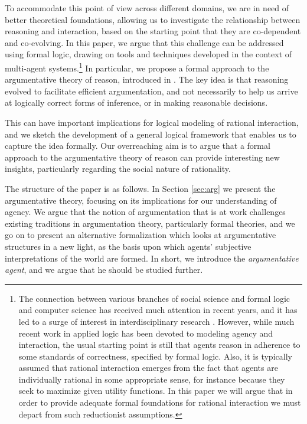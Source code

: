 \documentclass[greybox]{svmult}
\begin{document}
To accommodate this point of view across different domains, we are in need of better theoretical foundations, allowing us to investigate the relationship between reasoning and interaction, based on the starting point that they are co-dependent and co-evolving. In this paper, we argue that this challenge can be addressed using formal logic, drawing on tools and techniques developed in the context of multi-agent systems.\footnote{The connection between various branches of social science and formal logic and computer science has received much attention in recent years, and it has led to a surge of interest in interdisciplinary research \cite{parikh,benthem2,verbrugge}. However, while much recent work in applied logic has been devoted to modeling agency and interaction, the usual starting point is still that agents reason in adherence to some standards of correctness, specified by formal logic. Also, it is typically assumed that rational interaction emerges from the fact that agents are individually rational in some appropriate sense, for instance because they seek to maximize given utility functions. In this paper we will argue that in order to provide adequate formal foundations for rational interaction we must depart from such reductionist assumptions.} In particular, we propose a formal approach to the argumentative theory of reason, introduced in \cite{mercier}. The key idea is that reasoning evolved to facilitate efficient argumentation, and not necessarily to help us arrive at logically correct forms of inference, or in making reasonable decisions.

This can have important implications for logical modeling of rational interaction, and we sketch the development of a general logical framework that enables us to capture the idea formally. Our overreaching aim is to argue that a formal approach to the argumentative theory of reason can provide interesting new insights, particularly regarding the social nature of rationality. 

The structure of the paper is as follows. In Section \ref{sec:arg} we present the argumentative theory, focusing on its implications for our understanding of agency. We argue that the notion of argumentation that is at work challenges existing traditions in argumentation theory, particularly formal theories, and we go on to present an alternative formalization which looks at argumentative structures in a new light, as the basis upon which agents' subjective interpretations of the world are formed. In short, we introduce the \emph{argumentative agent}, and we argue that he should be studied further.
\end{document}

